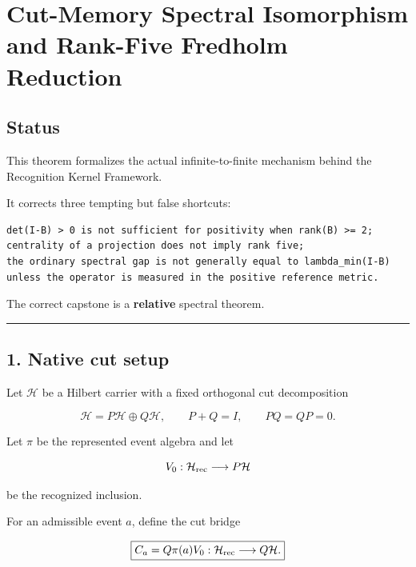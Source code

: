 \hypertarget{cut-memory-spectral-isomorphism-and-rank-five-fredholm-reduction}{%
\chapter{Cut-Memory Spectral Isomorphism and Rank-Five Fredholm Reduction}\label{cut-memory-spectral-isomorphism-and-rank-five-fredholm-reduction}}

\hypertarget{status}{%
\section{Status}\label{status}}

This theorem formalizes the actual infinite-to-finite mechanism behind the Recognition Kernel Framework.

It corrects three tempting but false shortcuts:

\begin{verbatim}
det(I-B) > 0 is not sufficient for positivity when rank(B) >= 2;
centrality of a projection does not imply rank five;
the ordinary spectral gap is not generally equal to lambda_min(I-B)
unless the operator is measured in the positive reference metric.
\end{verbatim}

The correct capstone is a \textbf{relative} spectral theorem.

\begin{center}\rule{0.5\linewidth}{0.5pt}\end{center}

\hypertarget{native-cut-setup}{%
\section{1. Native cut setup}\label{native-cut-setup}}

Let \(\mathcal H\) be a Hilbert carrier with a fixed orthogonal cut decomposition

\[
\mathcal H=P\mathcal H\oplus Q\mathcal H,
\qquad
P+Q=I,
\qquad
PQ=QP=0.
\]

Let \(\pi\) be the represented event algebra and let

\[
V_0:\mathcal H_{\rm rec}\longrightarrow P\mathcal H
\]

be the recognized inclusion.

For an admissible event \(a\), define the cut bridge

\[
\boxed{
C_a=Q\pi(a)V_0:
\mathcal H_{\rm rec}\longrightarrow Q\mathcal H.
}
\]

